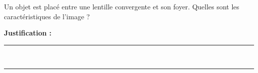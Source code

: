 Un objet est placé entre une lentille convergente et son foyer. Quelles sont les caractéristiques de l'image ?

\choices

\noindent\textbf{Justification :} \hrulefill \\[2.5ex]
\rule{\linewidth}{0.4pt} \\[2.5ex]
\rule{\linewidth}{0.4pt}
\vfill
